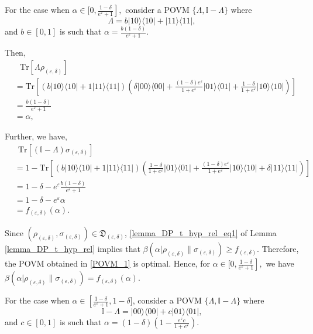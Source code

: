 \documentclass[onecolumn,ldraftcls, 11pt]{IEEEtran}
\newcommand{\tr}{\mathrm{Tr}}
\newcommand{\nn}{\nonumber}
\newcommand{\ketbra}[1]{|#1\rangle\langle#1|}
\newcommand{\eps}{\varepsilon}
\newcommand*{\bbI}{\mathbb{I}}
\begin{document}
\begin{steps}

    \item For the case when $\alpha \in [0,\left.\frac{1-\delta}{e^\eps + 1}\right],$ consider a POVM $\{\Lambda,\bbI - \Lambda\}$ 
where 
\begin{equation}
   \Lambda = b \ketbra{10} + \ketbra{11},\label{POVM_1} 
\end{equation}
and $b \in [0,1]$ is such that $\alpha = \frac{b (1-\delta)}{e^\eps + 1}$.

\quad Then, 
\begin{align}
    &~~~\tr\left[\Lambda \rho_{(\eps,\delta)}\right]\nn\\ 
      &= \tr\left[\left( b \ketbra{10} + 1\ketbra{11} \right)\left( \delta \ketbra{00} + \frac{(1-\delta)e^\eps}{1+e^\eps}\ketbra{01} + \frac{1-\delta}{1+e^\eps}\ketbra{10}\right)\right]\nn\\
    &= \frac{b (1-\delta)}{e^\eps + 1}\nn\\
    &= \alpha, \nn
\end{align}


\quad Further, we have,
\begin{align}
    &~~\tr\left[(\bbI-\Lambda )\sigma_{(\eps,\delta)}\right]\nn\\
    &= 1 - \tr\left[\left(b \ketbra{10} + 1\ketbra{11} \right) \left(\frac{1-\delta}{1+e^\eps}\ketbra{01} + \frac{(1-\delta)e^\eps}{1+e^\eps}\ketbra{10} + \delta\ketbra{11}\right)\right]\nn\\
    &= 1 - \delta - e^\eps \frac{b (1-\delta)}{e^\eps + 1}\nn\\
    &= 1 -\delta -e^\eps\alpha\nn \\
    & = f_{(\eps,\delta)}(\alpha). \nn
\end{align}

\quad Since $(\rho_{(\eps, \delta)},\sigma_{(\eps, \delta)})\in  \mathfrak{D}_{(\eps,\delta)}$, \eqref{lemma_DP_t_hyp_rel_eq1} of Lemma \ref{lemma_DP_t_hyp_rel} implies that $\beta(\alpha|\rho_{(\eps, \delta)}\|\sigma_{(\eps, \delta)}) \geq f_{(\eps,\delta)}$. Therefore, the POVM obtained in \eqref{POVM_1} is optimal. Hence, for $\alpha \in [0,\left.\frac{1-\delta}{e^\eps + 1}\right],$ we have $\beta(\alpha|\rho_{(\eps,\delta)}\|\sigma_{(\eps,\delta)}) = f_{(\eps,\delta)}(\alpha).$ 


\item For the case when $\alpha \in \left[\frac{1-\delta}{e^\eps + 1}\right., 1 -\delta]$, consider a POVM $\{\Lambda,\bbI - \Lambda\}$ 
where 
\begin{equation}
 \mathbb{I} - \Lambda = \ketbra{00} + c \ketbra{01} ,\label{POVM_2} 
\end{equation}
and $c \in [0,1]$ is such that $\alpha = (1-\delta)\left(1 - \frac{e^\eps  c}{ 1 + e^\eps}\right)$.


\end{steps}
\end{document}
